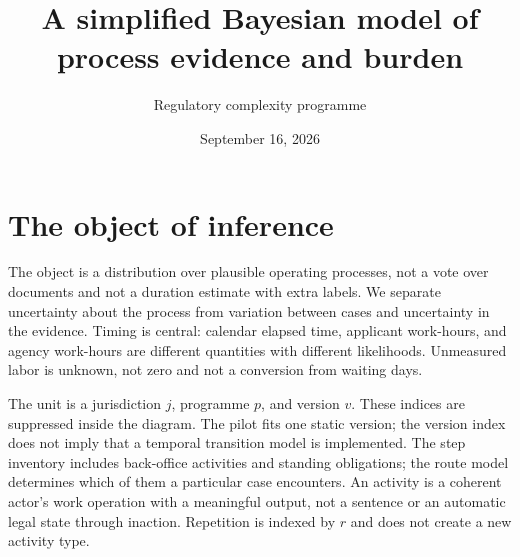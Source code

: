 \documentclass[11pt]{article}
\title{A simplified Bayesian model of process evidence and burden}
\author{Regulatory complexity programme}
\date{September 16, 2026}
\begin{document}
\maketitle

\section{The object of inference}
The object is a distribution over plausible operating processes, not a vote
over documents and not a duration estimate with extra labels. We separate
uncertainty about the process from variation between cases and uncertainty in
the evidence. Timing is central: calendar elapsed time, applicant work-hours,
and agency work-hours are different quantities with different likelihoods.
Unmeasured labor is unknown, not zero and not a conversion from waiting days.

The unit is a jurisdiction $j$, programme $p$, and version $v$. These indices
are suppressed inside the diagram. The pilot fits one static version; the
version index does not imply that a temporal transition model is implemented.
The step inventory includes back-office activities and standing obligations;
the route model determines which of them a particular case encounters.
An activity is a coherent actor's work operation with a meaningful output, not a
sentence or an automatic legal state through inaction. Repetition is indexed by
$r$ and does not create a new activity type.

\begin{figure}[p]
\centering
\resizebox{.92\textwidth}{!}{}

\end{figure}
\end{document}
